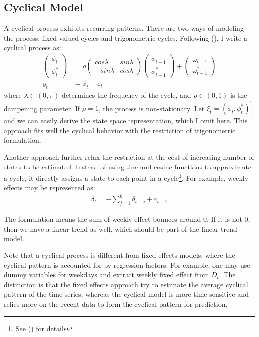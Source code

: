 \documentclass[10pt, titlepage]{article}
\numberwithin{equation}{section}
\begin{document}
\subsection{Cyclical Model}
A cyclical process exhibits recurring patterns. There are two ways of modeling the process: fixed valued cycles and trigonometric cycles. Following (\cite{harvey_1985}), I write a cyclical process as:
\begin{align*}
    \begin{pmatrix}\phi_t \\\phi_t^{*}\end{pmatrix} &= \rho 
        \begin{pmatrix}cos\lambda & sin\lambda \\-sin\lambda & cos\lambda 
        \end{pmatrix}\begin{pmatrix}\phi_{t-1} \\ \phi_{t-1}^{*}\end{pmatrix} 
        + \begin{pmatrix}\omega_{t-1} \\ \omega_{t-1}^{*}\end{pmatrix} \\
    y_t &= \phi_t + \varepsilon_t
\end{align*}
where $\lambda\in (0, \pi)$ determines the frequency of the cycle, and $\rho\in (0, 1)$ is the dampening parameter. If $\rho=1$, the process is non-stationary. Let $\xi_t = (\phi_t, \phi_t^{*})^{'}$, and we can easily derive the state space representation, which I omit here. This approach fits well the cyclical behavior with the restriction of trigonometric formulation. 

    Another approach further relax the restriction at the cost of increasing number of states to be estimated. Instead of using sine and cosine functions to approximate a cycle, it directly assigns a state to each point in a cycle\footnote{See (\cite{harvey2007trends}) for details}. For example, weekly effects may be represented as:
\begin{align*}
    \delta_t = -\sum_{j=1}^{6}\delta_{t-j} + \varepsilon_{t-1}
\end{align*}

The formulation means the sum of weekly effect bounces around 0. If it is not 0, then we have a linear trend as well, which should be part of the linear trend model.

Note that a cyclical process is different from fixed effects models, where the cyclical pattern is accounted for by regression factors. For example, one may use dummy variables for weekdays and extract weekly fixed effect from $D_t$. The distinction is that the fixed effects approach try to estimate the average cyclical pattern of the time series, whereas the cyclical model is more time sensitive and relies more on the recent data to form the cyclical pattern for prediction. 
\end{document}

